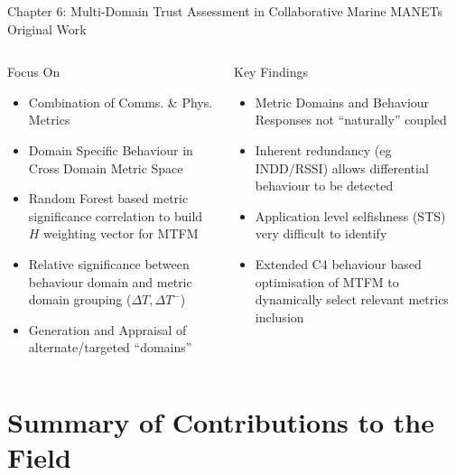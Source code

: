 \documentclass[aspectratio=169]{beamer}
\begin{document}
\begin{frame}{Chapter 6: Multi-Domain Trust Assessment in Collaborative Marine MANETs}
	Original Work
	\begin{columns}
		\begin{column}{0.5\textwidth}
			\begin{block}{Focus On}
				\begin{itemize}
					\item Combination of Comms. \& Phys. Metrics
					\item Domain Specific Behaviour in Cross Domain Metric Space
					\item Random Forest based metric significance correlation to build $H$ weighting vector for MTFM
					\item Relative significance between behaviour domain and metric domain grouping ($\Delta T, \Delta T^-$)
					\item Generation and Appraisal of alternate/targeted ``domains''
				\end{itemize}
			\end{block}
		\end{column}
		\begin{column}{0.5\textwidth}
			\begin{exampleblock}{Key Findings}
				\begin{itemize}
					\item Metric Domains and Behaviour Responses not ``naturally'' coupled
					\item Inherent redundancy (eg INDD/RSSI) allows differential behaviour to be detected
					\item Application level selfishness (STS) very difficult to identify
					\item Extended C4 behaviour based optimisation of MTFM to dynamically select relevant metrics inclusion
				\end{itemize}
			\end{exampleblock}
		\end{column}
	\end{columns}
\end{frame}



\section*{Summary of Contributions to the Field}
\end{document}
